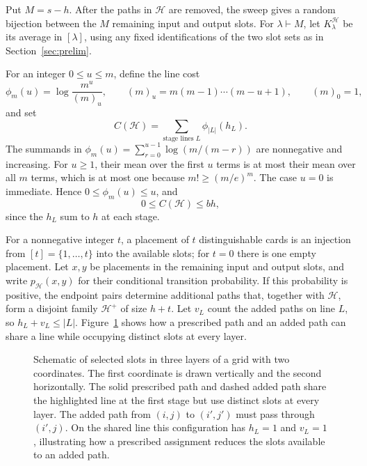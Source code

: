 Put \(M=s-h\). After the paths in \(\mathcal H\) are removed, the sweep gives
a random bijection between the \(M\) remaining input and output slots. For
\(\lambda\vdash M\), let \(K_\lambda^{\mathcal H}\) be its average in
\([\lambda]\), using any fixed identifications of the two slot sets as in
Section~\ref{sec:prelim}.

For an integer \(0\le u\le m\), define the line cost
\[
 \phi_m(u)=\log\frac{m^u}{(m)_u},\qquad
 (m)_u=m(m-1)\cdots(m-u+1),\qquad (m)_0=1,
\]
and set
\[
 C(\mathcal H)=\sum_{\text{stage lines }L}\phi_{|L|}(h_L).
\]
The summands in
\(\phi_m(u)=\sum_{r=0}^{u-1}\log(m/(m-r))\) are nonnegative and increasing.
For \(u\ge1\), their mean over the first \(u\) terms is at most their mean
over all \(m\) terms, which is at most one because \(m!\ge(m/e)^m\).
The case \(u=0\) is immediate. Hence \(0\le\phi_m(u)\le u\), and
\[
 0\le C(\mathcal H)\le bh,
\]
since the \(h_L\) sum to \(h\) at each stage.

For a nonnegative integer \(t\), a placement of \(t\) distinguishable cards is an injection from
\([t]=\{1,\ldots,t\}\) into the available slots; for \(t=0\) there is one
empty placement. Let \(x,y\) be placements in the remaining input and output
slots, and write \(p_{\mathcal H}(x,y)\) for their conditional transition
probability. If this probability is positive, the endpoint pairs determine
additional paths that, together with \(\mathcal H\), form a disjoint family
\(\mathcal H^+\) of size \(h+t\). Let \(v_L\) count the added paths on line
\(L\), so \(h_L+v_L\le |L|\). Figure~\ref{fig:trajectory} shows how a
prescribed path and an added path can share a line while occupying distinct
slots at every layer.

\begin{figure}[H]
\centering

\caption{Schematic of selected slots in three layers of a grid with two coordinates.
The first coordinate is drawn vertically and the second horizontally.
The solid prescribed path and dashed added path share the highlighted
line at the first stage but use distinct slots at every layer. The added path from
\((i,j)\) to \((i',j')\) must pass through \((i',j)\). On the shared line this
configuration has \(h_L=1\) and \(v_L=1\), illustrating how a prescribed
assignment reduces the slots available to an added path.}
\label{fig:trajectory}
\end{figure}

